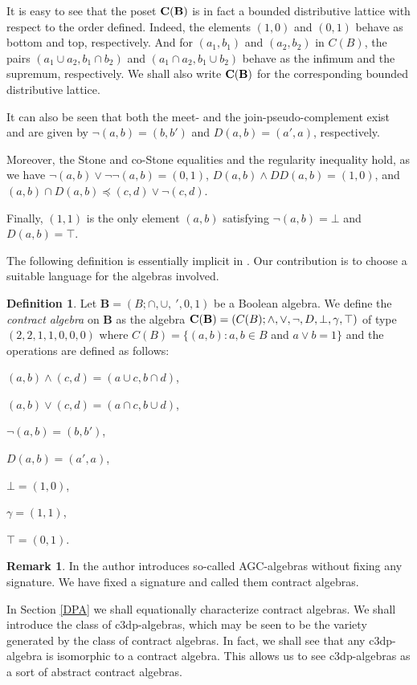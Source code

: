 \documentclass[a4paper,11pt]{article}
\theoremstyle{definition}
\newtheorem{defn}[theorem]{Definition}
\newtheorem{rem}[theorem]{Remark}
\newcommand{\cb}{\bf{C(B)}}
\newcommand{\cbs}{C(B)}
\begin{document}
It is easy to see that the poset $\cb$ is in fact a bounded distributive lattice with respect to the order defined. 
Indeed, the elements $(1,0)$ and $(0,1)$ behave as bottom and top, respectively.
And for $(a_1,b_1)$ and $(a_2, b_2)$ in $\cbs$, the pairs $(a_1 \cup a_2, b_1 \cap b_2)$ and $(a_1 \cap a_2, b_1 \cup b_2)$ behave as the infimum and the supremum, respectively.
We shall also write $\cb$ for the corresponding bounded distributive lattice. 

It can also be seen that both the meet- and the join-pseudo-complement exist and are given by $\neg (a,b) = (b, b')$ and $D(a,b) = (a', a)$, respectively.
 
Moreover, the Stone and co-Stone equalities and the regularity inequality hold, as we have $\neg (a,b) \vee \neg \neg (a,b) = (0,1)$, $D(a,b) \wedge DD(a,b) = (1,0)$, and $(a,b) \cap D(a,b) \preceq (c,d) \vee \neg (c,d)$.

Finally, $(1,1)$ is the only element $(a,b)$ satisfying $\neg (a,b) = \bot$ and $D(a,b) = \top$.

The following definition is essentially implicit in \cite{IR}. 
Our contribution is to choose a suitable language for the algebras involved. 

\begin{defn} \label{calg}
Let $\mathbf{B} = (B; \cap, \cup,\ ', 0, 1)$ be a Boolean algebra. 
We define the \emph{contract algebra} on $\mathbf{B}$ as the algebra ${\bf{C(B)}} = (C(B); \wedge, \vee, \neg, D, \bot, \gamma, \top)$ of type $(2, 2, 1, 1, 0, 0, 0)$ 
where $C(B) = \{ (a,b): a,b \in B $ and $a \vee b = 1\}$ and the operations are defined as follows:

$(a,b) \wedge (c,d) = (a \cup c, b \cap d)$, 

$(a,b) \vee (c,d) = (a \cap c, b \cup d)$, 

$\neg (a,b) = (b, b')$,

$D(a,b) = (a', a)$,

$\bot = (1,0)$,

$\gamma = (1,1)$,

$\top = (0,1)$.
\end{defn}

\begin{rem}
In \cite{IR} the author introduces so-called AGC-algebras without fixing any signature. 
We have fixed a signature and called them contract algebras.
\end{rem}

In Section \ref{DPA} we shall equationally characterize contract algebras. 
We shall introduce  the class of c3dp-algebras, which may be seen to be the variety generated by the class of contract algebras. 
In fact, we shall see that any c3dp-algebra is isomorphic to a contract algebra. 
This allows us to see c3dp-algebras as a sort of abstract contract algebras.
\end{document}
